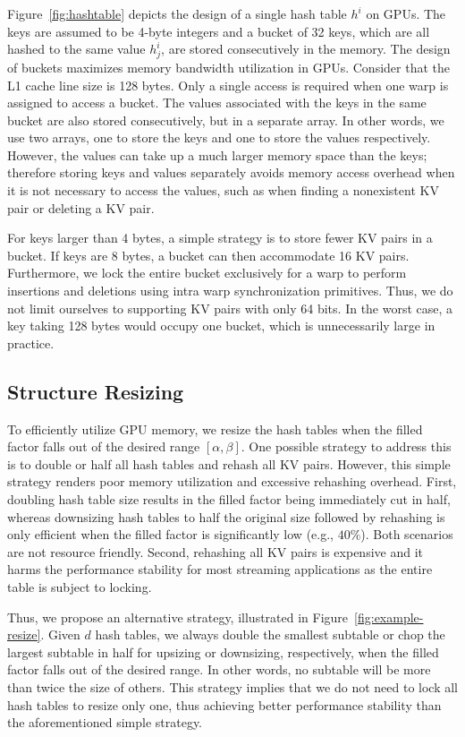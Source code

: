 Figure~\ref{fig:hashtable} depicts the design of a single hash table $h^i$ on GPUs. 
The keys are assumed to be 4-byte integers and a bucket of 32 keys, which are all hashed to the same value $h^i_j$, are stored consecutively in the memory. 
The design of buckets maximizes memory bandwidth utilization in GPUs. 
Consider that the L1 cache line size is 128 bytes. Only a single access is required when one warp is assigned to access a bucket. 
The values associated with the keys in the same bucket are also stored consecutively, but in a separate array.  
In other words, we use two arrays, one to store the keys and one to store the values respectively.
However, the values can take up a much larger memory space than the keys; therefore storing keys and values separately avoids memory access overhead when it is not necessary to access the values, such as when finding a nonexistent KV pair or deleting a KV pair. 

For keys larger than 4 bytes, a simple strategy is to store fewer KV pairs in a bucket. If keys are 8 bytes, a bucket can then accommodate 16 KV pairs. 
Furthermore, we lock the entire bucket exclusively for a warp to perform insertions and deletions using intra warp synchronization primitives. Thus, we do not limit ourselves to supporting KV pairs with only 64 bits. 
In the worst case, a key taking 128 bytes would occupy one bucket, which is unnecessarily large in practice.

\subsection{Structure Resizing}\label{sec:dyn:resize}
To efficiently utilize GPU memory, we resize the hash tables when the filled factor falls out of the desired range $[\alpha,\beta]$.
One possible strategy to address this is to double or half all hash tables and rehash all KV pairs. However, this simple strategy renders poor memory utilization and 
excessive rehashing overhead. First, doubling hash table size results in the filled factor being immediately cut in half, whereas downsizing hash tables to half the original size followed by rehashing is only efficient when the filled factor is significantly low (e.g., $40\%$). Both scenarios are not resource friendly. Second, rehashing all KV pairs is expensive and it harms the performance stability for most streaming applications as the entire table is subject to locking. 

Thus, we propose an alternative strategy, illustrated in Figure~\ref{fig:example-resize}.
Given $d$ hash tables,
we always double the smallest subtable or chop the largest subtable in half for upsizing or downsizing, respectively, when the filled factor falls out of the desired range. 
In other words, no subtable will be more than twice the size of others. This strategy implies that we do not need to lock all hash tables to resize only one, thus achieving better performance stability than the aforementioned simple strategy. 


